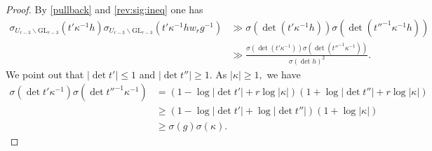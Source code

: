 \documentclass[12pt]{amsart}
\theoremstyle{remark}
\numberwithin{equation}{section}
\newcommand{\GL}{\mathrm{GL}}
\theoremstyle{definition}
\numberwithin{equation}{subsection}
\begin{document}
\begin{proof}
By \eqref{pullback} and \eqref{rev:sig:ineq} one has
\begin{align*}\sigma_{U_{r-3} \backslash \GL_{r-3}}(t'\kappa^{-1}h )\sigma_{U_{r-3} \backslash \GL_{r-3}}(t'\kappa^{-1} hw_rg^{-1}) &\gg \sigma (\det(t'\kappa^{-1}h))\sigma (\det (t''^{-1}\kappa^{-1} h))\\&\gg \frac{\sigma (\det (t'\kappa^{-1}) )\sigma (\det (t''^{-1}\kappa^{-1} ))}{\sigma(\det h)^2}.
\end{align*}
We point out that 
 $|\det t'|\leq 1$ and $|\det t''| \geq 1.$
As $|\kappa|\ge 1,$ we have
\begin{align*}
    \sigma (\det t'\kappa^{-1} )\sigma (\det t''^{-1}\kappa^{-1} )&=(1-\log |\det t'|+r\log |\kappa|)(1+\log |\det t''|+r\log |\kappa|)\\
     &\ge (1-\log |\det t'|+\log |\det t''| )(1+\log |\kappa|)\\
     &\ge \sigma(g)\sigma(\kappa).
\end{align*}

\end{proof}
\end{document}
